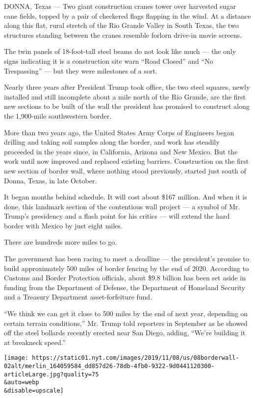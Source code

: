 DONNA, Texas --- Two giant construction cranes tower over harvested
sugar cane fields, topped by a pair of checkered flags flapping in the
wind. At a distance along this flat, rural stretch of the Rio Grande
Valley in South Texas, the two structures standing between the cranes
resemble forlorn drive-in movie screens.

The twin panels of 18-foot-tall steel beams do not look like much ---
the only signs indicating it is a construction site warn ``Road Closed''
and ``No Trespassing'' --- but they were milestones of a sort.

Nearly three years after President Trump took office, the two steel
squares, newly installed and still incomplete about a mile north of the
Rio Grande, are the first new sections to be built of the wall the
president has promised to construct along the 1,900-mile southwestern
border.

More than two years ago, the United States Army Corps of Engineers began
drilling and taking soil samples along the border, and work has steadily
proceeded in the years since, in California, Arizona and New Mexico. But
the work until now improved and replaced existing barriers. Construction
on the first new section of border wall, where nothing stood previously,
started just south of Donna, Texas, in late October.

It began months behind schedule. It will cost about \$167 million. And
when it is done, this landmark section of the contentious wall project
--- a symbol of Mr. Trump's presidency and a flash point for his critics
--- will extend the hard border with Mexico by just eight miles.

There are hundreds more miles to go.

The government has been racing to meet a deadline --- the president's
promise to build approximately 500 miles of border fencing by the end of
2020. According to Customs and Border Protection officials, about \$9.8
billion has been set aside in funding from the Department of Defense,
the Department of Homeland Security and a Treasury Department
asset-forfeiture fund.

``We think we can get it close to 500 miles by the end of next year,
depending on certain terrain conditions,'' Mr. Trump told reporters in
September as he showed off the steel bollards recently erected near San
Diego, adding, ``We're building it at breakneck speed.''

\texttt{[image: https://static01.nyt.com/images/2019/11/08/us/08borderwall-02alt/merlin\_164059584\_dd857d26-78db-4fb0-9322-9d0441120300-articleLarge.jpg?quality=75\\\&auto=webp\\\&disable=upscale]}

